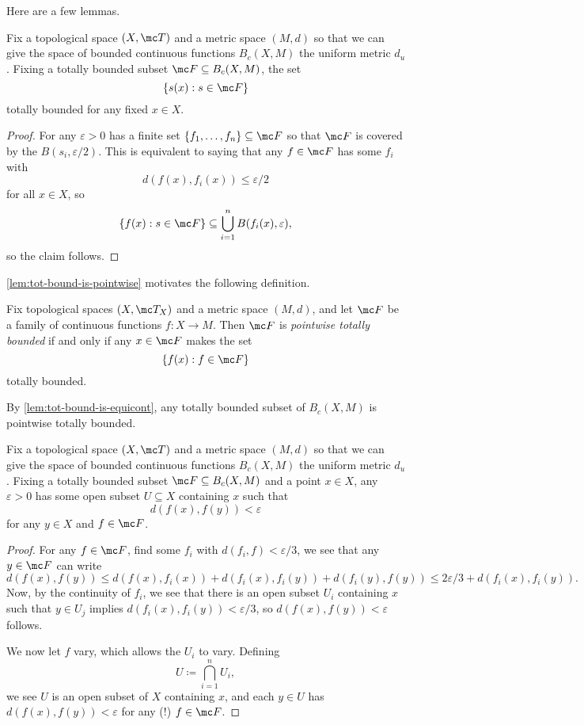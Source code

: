 \documentclass[../notes.tex]{subfiles}
\begin{document}
Here are a few lemmas.
\begin{lemma} \label{lem:tot-bound-is-pointwise}
	Fix a topological space $(X,\mc T)$ and a metric space $(M,d)$ so that we can give the space of bounded continuous functions $B_c(X,M)$ the uniform metric $d_u$. Fixing a totally bounded subset $\mc F\subseteq B_c(X,M)$, the set
	\[\{s(x):s\in \mc F\}\]
	totally bounded for any fixed $x\in X$.
\end{lemma}
\begin{proof}
	For any $\varepsilon>0$ has a finite set $\{f_1,\ldots,f_n\}\subseteq \mc F$ so that $\mc F$ is covered by the $B(s_i,\varepsilon/2)$. This is equivalent to saying that any $f\in \mc F$ has some $f_i$ with
	\[d(f(x),f_i(x))\le\varepsilon/2\]
	for all $x\in X$, so
	\[\{f(x):s\in \mc F\}\subseteq\bigcup_{i=1}^nB(f_i(x),\varepsilon),\]
	so the claim follows.
\end{proof}
\autoref{lem:tot-bound-is-pointwise} motivates the following definition.
\begin{definition}
	Fix topological spaces $(X,\mc T_X)$ and a metric space $(M,d)$, and let $\mc F$ be a family of continuous functions $f\colon X\to M$. Then $\mc F$ is \textit{pointwise totally bounded} if and only if any $x\in \mc F$ makes the set
	\[\{f(x):f\in\mc F\}\]
	totally bounded.
\end{definition}
\begin{example}
	By \autoref{lem:tot-bound-is-equicont}, any totally bounded subset of $B_c(X,M)$ is pointwise totally bounded.
\end{example}
\begin{lemma} \label{lem:tot-bound-is-equicont}
	Fix a topological space $(X,\mc T)$ and a metric space $(M,d)$ so that we can give the space of bounded continuous functions $B_c(X,M)$ the uniform metric $d_u$. Fixing a totally bounded subset $\mc F\subseteq B_c(X,M)$ and a point $x\in X$, any $\varepsilon>0$ has some open subset $U\subseteq X$ containing $x$ such that
	\[d(f(x),f(y))<\varepsilon\]
	for any $y\in X$ and $f\in \mc F$.
\end{lemma}
\begin{proof}
	For any $f\in \mc F$, find some $f_i$ with $d(f_i,f)<\varepsilon/3$, we see that any $y\in \mc F$ can write
	\[d(f(x),f(y))\le d(f(x),f_i(x))+d(f_i(x),f_i(y))+d(f_i(y),f(y))\le2\varepsilon/3+d(f_i(x),f_i(y)).\]
	Now, by the continuity of $f_i$, we see that there is an open subset $U_i$ containing $x$ such that $y\in U_j$ implies $d(f_i(x),f_i(y))<\varepsilon/3$, so $d(f(x),f(y))<\varepsilon$ follows.

	We now let $f$ vary, which allows the $U_i$ to vary. Defining
	\[U\coloneqq\bigcap_{i=1}^nU_i,\]
	we see $U$ is an open subset of $X$ containing $x$, and each $y\in U$ has $d(f(x),f(y))<\varepsilon$ for any (!) $f\in \mc F$.
\end{proof}
\end{document}
